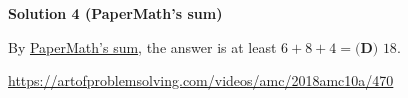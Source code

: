 \begin{enumerate}
\textbf{Solution 4 (PaperMath's sum)}

By \href{https://artofproblemsolving.com/wiki/index.php?title=PaperMath\%E2\%80\%99s\_sum}{PaperMath’s sum}, the answer is at least $6+8+4=\boxed{\textbf{(D) } 18}.$

 \href{https://artofproblemsolving.com/videos/amc/2018amc10a/470}{https://artofproblemsolving.com/videos/amc/2018amc10a/470}

 


\end{enumerate}